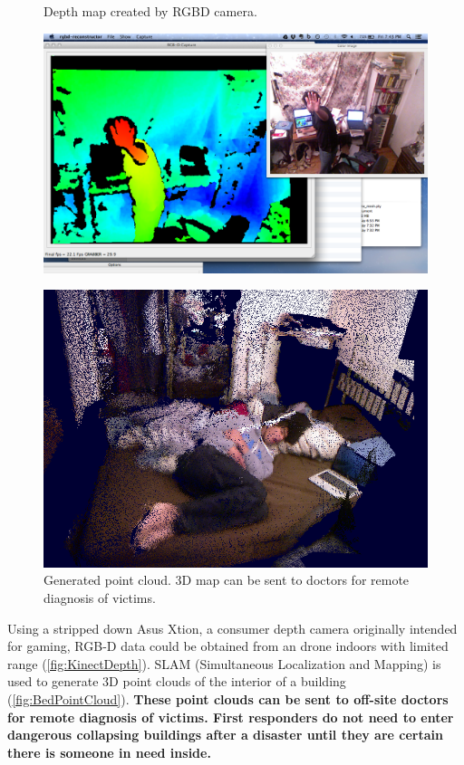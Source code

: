 \begin{figure}[h]
	\begin{minipage}{.5\textwidth}
		\caption{Depth map created by RGBD camera.}
		\label{fig:KinectDepth}
		\centering
			\includegraphics[width=.95\linewidth]{illustrations/clouds/depth}
	\end{minipage}
	\begin{minipage}{.5\textwidth}
		\caption{Generated point cloud. 3D map can be sent to doctors for remote diagnosis of victims.}
		\label{fig:BedPointCloud}
		\centering
			\includegraphics[width=.95\linewidth]{illustrations/clouds/bed}
	\end{minipage}
\end{figure}

Using a stripped down Asus Xtion, a consumer depth camera originally intended for gaming, RGB-D data could be obtained from an drone indoors with limited range (\autoref{fig:KinectDepth}). SLAM (Simultaneous Localization and Mapping) is used to generate 3D point clouds of the interior of a building (\autoref{fig:BedPointCloud}). \textbf{These point clouds can be sent to off-site doctors for remote diagnosis of victims. First responders do not need to enter dangerous collapsing buildings after a disaster until they are certain there is someone in need inside.}

